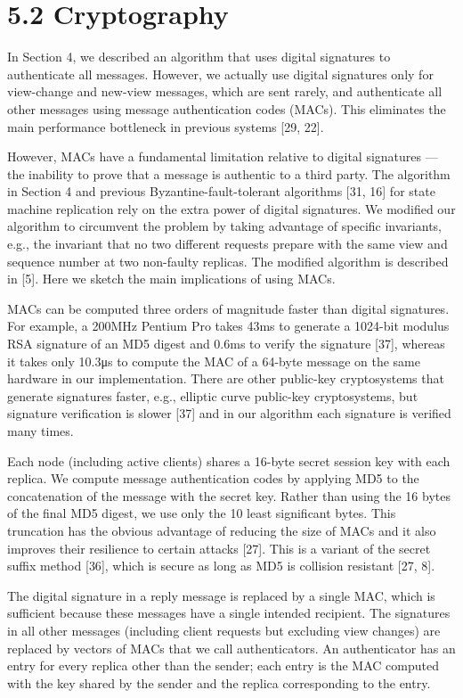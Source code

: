 \documentclass[
]{article}
\begin{document}
\section{5.2 Cryptography}\label{cryptography}

In Section 4, we described an algorithm that uses digital signatures to
authenticate all messages. However, we actually use digital signatures
only for view-change and new-view messages, which are sent rarely, and
authenticate all other messages using message authentication codes
(MACs). This eliminates the main performance bottleneck in previous
systems {[}29, 22{]}.

However, MACs have a fundamental limitation relative to digital
signatures --- the inability to prove that a message is authentic to a
third party. The algorithm in Section 4 and previous
Byzantine-fault-tolerant algorithms {[}31, 16{]} for state machine
replication rely on the extra power of digital signatures. We modified
our algorithm to circumvent the problem by taking advantage of specific
invariants, e.g., the invariant that no two different requests prepare
with the same view and sequence number at two non-faulty replicas. The
modified algorithm is described in {[}5{]}. Here we sketch the main
implications of using MACs.

MACs can be computed three orders of magnitude faster than digital
signatures. For example, a 200MHz Pentium Pro takes 43ms to generate a
1024-bit modulus RSA signature of an MD5 digest and 0.6ms to verify the
signature {[}37{]}, whereas it takes only 10.3μs to compute the MAC of a
64-byte message on the same hardware in our implementation. There are
other public-key cryptosystems that generate signatures faster, e.g.,
elliptic curve public-key cryptosystems, but signature verification is
slower {[}37{]} and in our algorithm each signature is verified many
times.

Each node (including active clients) shares a 16-byte secret session key
with each replica. We compute message authentication codes by applying
MD5 to the concatenation of the message with the secret key. Rather than
using the 16 bytes of the final MD5 digest, we use only the 10 least
significant bytes. This truncation has the obvious advantage of reducing
the size of MACs and it also improves their resilience to certain
attacks {[}27{]}. This is a variant of the secret suffix method
{[}36{]}, which is secure as long as MD5 is collision resistant {[}27,
8{]}.

The digital signature in a reply message is replaced by a single MAC,
which is sufficient because these messages have a single intended
recipient. The signatures in all other messages (including client
requests but excluding view changes) are replaced by vectors of MACs
that we call authenticators. An authenticator has an entry for every
replica other than the sender; each entry is the MAC computed with the
key shared by the sender and the replica corresponding to the entry.
\end{document}
